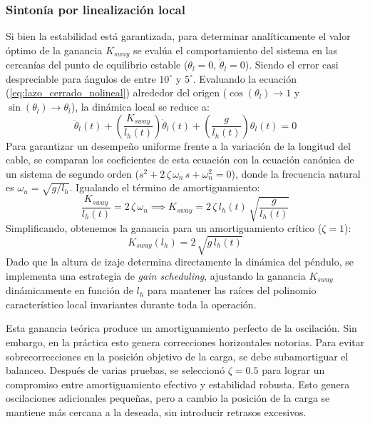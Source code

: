 \subsubsection{Sintonía por linealización local}
Si bien la estabilidad está garantizada, para determinar analíticamente el valor óptimo de la ganancia $K_{sway}$ se evalúa el comportamiento del sistema en las cercanías del punto de equilibrio estable ($\theta_l = 0$, $\dot{\theta}_l = 0$). Siendo el error casi despreciable para ángulos de entre $10^\circ$ y $5^\circ$.
Evaluando la ecuación (\ref{eq:lazo_cerrado_nolineal}) alrededor del origen ($\cos(\theta_l) \to 1$ y $\sin(\theta_l) \to \theta_l$), la dinámica local se reduce a:
\begin{equation}
    \ddot{\theta}_l(t) + \left( \frac{K_{sway}}{l_h(t)} \right) \dot{\theta}_l(t) + \left( \frac{g}{l_h(t)} \right) \theta_l(t) = 0
\end{equation}
Para garantizar un desempeño uniforme frente a la variación de la longitud del cable, se comparan los coeficientes de esta ecuación con la ecuación canónica de un sistema de segundo orden ($s^2 + 2\,\zeta\,\omega_n \,s + \omega_n^2 = 0$), donde la frecuencia natural es $\omega_n = \sqrt{g/l_h}$. Igualando el término de amortiguamiento:
\begin{equation}
    \frac{K_{sway}}{l_h(t)} = 2 \, \zeta \, \omega_n \implies K_{sway} = 2 \, \zeta \, l_h(t) \, \sqrt{\frac{g}{l_h(t)}}
\end{equation}
Simplificando, obtenemos la ganancia para un amortiguamiento crítico ($\zeta = 1$):
\begin{equation}
    K_{sway}(l_h) = 2 \,\sqrt{g \, l_h(t)}
\end{equation}
Dado que la altura de izaje determina directamente la dinámica del péndulo, se implementa una estrategia de \textit{gain scheduling}, ajustando la ganancia $K_{sway}$ dinámicamente en función de $l_h$ para mantener las raíces del polinomio característico local invariantes durante toda la operación.

Esta ganancia teórica produce un amortiguamiento perfecto de la oscilación. Sin embargo, en la práctica esto genera correcciones horizontales 
notorias. Para evitar sobrecorrecciones en la posición objetivo de la carga, se debe subamortiguar el balanceo. Después de varias pruebas, 
se seleccionó $\zeta = 0.5$ para lograr un compromiso entre amortiguamiento efectivo y estabilidad robusta. Esto genera oscilaciones 
adicionales pequeñas, pero a cambio la posición de la carga se mantiene más cercana a la deseada, sin introducir retrasos excesivos.

